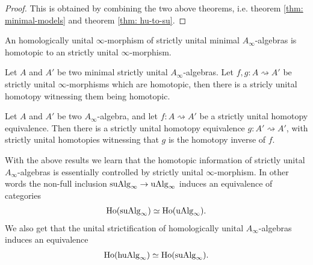 \documentclass[../thesis.tex]{subfiles}
\begin{document}
            \begin{proof}
                This is obtained by combining the two above theorems, i.e. theorem \ref{thm: minimal-models} and theorem \ref{thm: hu-to-su}.
            \end{proof}

            \begin{thm}
                An homologically unital $\infty$-morphism of strictly unital minimal $A_\infty$-algebras is homotopic to an strictly unital $\infty$-morphism.
            \end{thm}

            \begin{thm}
                Let $A$ and $A'$ be two minimal strictly unital $A_\infty$-algebras. Let $f,g : A \rightsquigarrow A'$ be strictly unital $\infty$-morphisms which are homotopic, then there is a stricly unital homotopy witnessing them being homotopic.
            \end{thm}

            \begin{corollary}
                Let $A$ and $A'$ be two $A_\infty$-algebra, and let $f : A \rightsquigarrow A'$ be a strictly unital homotopy equivalence. Then there is a strictly unital homotopy equivalence $g : A' \rightsquigarrow A'$, with strictly unital homotopies witnessing that $g$ is the homotopy inverse of $f$.
            \end{corollary}

            With the above results we learn that the homotopic information of strictly unital $A_\infty$-algebras is essentially controlled by strictly unital $\infty$-morphism. In other words the non-full inclusion $\tt{suAlg}_\infty \rightarrow \tt{uAlg}_\infty$ induces an equivalence of categories
            \begin{align*}
                \tt{Ho}(\tt{suAlg}_\infty) \simeq \tt{Ho}(\tt{uAlg}_\infty)\tt{.}
            \end{align*}
            We also get that the unital strictification of homologically unital $A_\infty$-algebras induces an equivalence
            \begin{align*}
                \tt{Ho}(\tt{huAlg}_\infty) \simeq \tt{Ho}(\tt{suAlg}_\infty)\tt{.}
            \end{align*}
\end{document}
